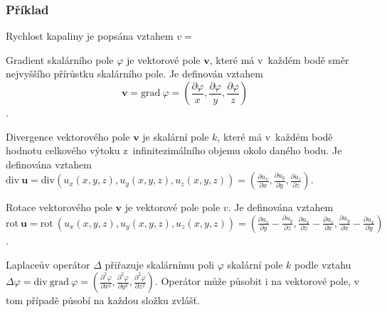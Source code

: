 \documentclass{book}
\newcommand{\vect}[1]{\boldsymbol{#1}}
\newcommand{\grad}{\mathrm{grad}}
\newcommand{\diverg}{\mathrm{div}}
\newcommand{\rot}{\mathrm{rot}}
\begin{document}
\subsubsection{Příklad}

Rychlost kapaliny je popsána vztahem \(v = \)





Gradient skalárního pole \(\varphi\) je vektorové pole \(\vect{v}\), které má v~každém bodě směr nejvyššího přírůstku skalárního pole. Je definován vztahem
\[
\vect{v} = \grad \ \varphi = \left(\frac{\partial \varphi}{x}, \frac{\partial \varphi}{y}, \frac{\partial \varphi}{z}\right)
\].

Divergence vektorového pole \(\vect{v}\) je skalární pole \(k\), které má v~každém bodě hodnotu celkového výtoku z~infinitezimálního objemu okolo daného bodu. Je definována vztahem \(\diverg \ \vect{u} = \diverg (u_x(x, y, z), u_y(x, y, z), u_z(x, y, z)) = \left(\frac{\partial u_x}{\partial x}, \frac{\partial u_y}{\partial y}, \frac{\partial u_z}{\partial z}\right)\).

Rotace vektorového pole \(\vect{v}\) je vektorové pole pole \(v\). Je definována vztahem \(\rot \ \vect{u} = \rot \ (u_x(x, y, z), u_y(x, y, z), u_z(x, y, z)) = \left(\frac{\partial u_z}{\partial y} - \frac{\partial u_y}{\partial z}, \frac{\partial u_x}{\partial z} - \frac{\partial u_z}{\partial x}, \frac{\partial u_y}{\partial x} - \frac{\partial u_x}{\partial y}\right)\).

Laplaceův operátor \(\Delta\) přiřazuje skalárnímu poli \(\varphi\) skalární pole \(k\) podle vztahu \(\Delta \varphi = \diverg \ \grad \ \varphi = \left(\frac{\partial^2 \varphi}{\partial x^2}, \frac{\partial^2 \varphi}{\partial y^2}, \frac{\partial^2 \varphi}{\partial z^2}\right)\). Operátor může působit i na vektorové pole, v tom případě působí na každou složku zvlášť.
\end{document}
